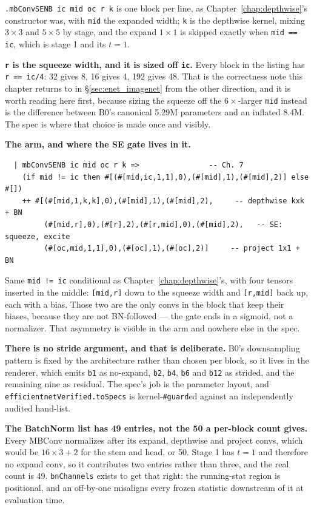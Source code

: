 \noindent \texttt{.mbConvSENB ic mid oc r k} is one block per line, as
Chapter~\ref{chap:depthwise}'s constructor was, with \texttt{mid} the
expanded width; \texttt{k} is the depthwise kernel, mixing $3 \times 3$
and $5 \times 5$ by stage, and the expand $1 \times 1$ is skipped exactly
when \texttt{mid == ic}, which is stage 1 and its $t=1$.

\textbf{\texttt{r} is the squeeze width, and it is sized off
\texttt{ic}.} Every block in the listing has \texttt{r == ic/4}: 32 gives
8, 16 gives 4, 192 gives 48. That is the correctness note this chapter
returns to in \S\ref{sec:enet_imagenet} from the other direction, and it
is worth reading here first, because sizing the squeeze off the
$6\times$-larger \texttt{mid} instead is the difference between B0's
canonical 5.29M parameters and an inflated 8.4M. The spec is where that
choice is made once and visibly.

\textbf{The arm, and where the SE gate lives in it.}

\begin{verbatim}
  | mbConvSENB ic mid oc r k =>                -- Ch. 7
    (if mid != ic then #[(#[mid,ic,1,1],0),(#[mid],1),(#[mid],2)] else #[])
    ++ #[(#[mid,1,k,k],0),(#[mid],1),(#[mid],2),     -- depthwise kxk + BN
         (#[mid,r],0),(#[r],2),(#[r,mid],0),(#[mid],2),   -- SE: squeeze, excite
         (#[oc,mid,1,1],0),(#[oc],1),(#[oc],2)]     -- project 1x1 + BN
\end{verbatim}

\noindent Same \texttt{mid != ic} conditional as
Chapter~\ref{chap:depthwise}'s, with four tensors inserted in the middle:
\texttt{[mid,r]} down to the squeeze width and \texttt{[r,mid]} back up,
each with a bias. Those two are the only convs in the block that
keep their biases, because they are not BN-followed --- the gate
ends in a sigmoid, not a normalizer. That asymmetry is visible in the
arm and nowhere else in the spec.

\textbf{There is no stride argument, and that is deliberate.} B0's
downsampling pattern is fixed by the architecture rather than chosen per
block, so it lives in the renderer, which emits \texttt{b1} as
no-expand, \texttt{b2}, \texttt{b4}, \texttt{b6} and \texttt{b12} as
strided, and the remaining nine as residual. The spec's job is the
parameter layout, and \texttt{efficientnetVerified.toSpecs} is
kernel-\texttt{\#guard}ed against an independently audited hand-list.

\textbf{The BatchNorm list has 49 entries, not the 50 a per-block count
gives.} Every MBConv normalizes after its expand, depthwise and project convs,
which would be $16 \times 3 + 2$ for the stem and head, or 50. Stage 1
has $t=1$ and therefore no expand conv, so it contributes two entries
rather than three, and the real count is 49. \texttt{bnChannels} exists
to get that right: the running-stat region is positional, and an
off-by-one misaligns every frozen statistic downstream of it at
evaluation time.


